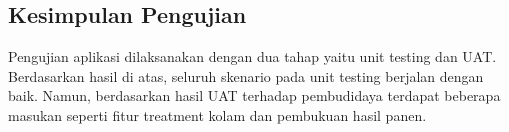 \begin{spacing}{1.5}
\subsection {Kesimpulan Pengujian}

Pengujian aplikasi dilaksanakan dengan dua tahap yaitu unit testing dan UAT. Berdasarkan hasil di atas, seluruh skenario pada unit testing berjalan dengan baik. Namun, berdasarkan hasil UAT terhadap pembudidaya terdapat beberapa masukan seperti fitur treatment kolam dan pembukuan hasil panen.

\end{spacing}
